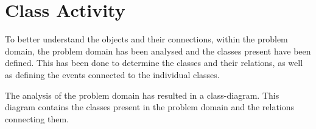 \section{Class Activity} \label{sc:classes}
To better understand the objects and their connections, within the problem domain, the problem domain has been analysed and the classes present have been defined. This has been done to determine the classes and their relations, as well as defining the events connected to the individual classes.
\par
The analysis of the problem domain has resulted in a class-diagram. This diagram contains the classes present in the problem domain and the relations connecting them.
